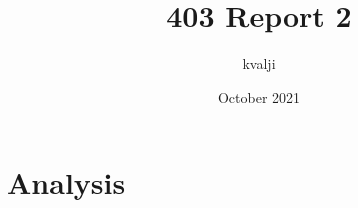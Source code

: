 \documentclass{article}
\title{403 Report 2}
\author{kvalji }
\date{October 2021}
\begin{document}
\maketitle

\section{Analysis}
\end{document}
